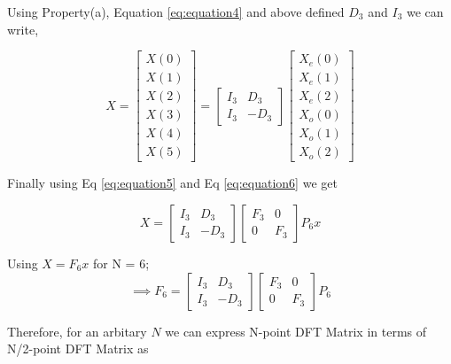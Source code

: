 \documentclass[journal,12pt,twocolumn]{IEEEtran}
\renewcommand\thesection{\arabic{section}}
\begin{document}
\begin{enumerate}[label=\thesection.\arabic*.,ref=\thesection.\theenumi]
Using Property(a), Equation \eqref{eq:equation4} and above defined $D_{3}$ and $I_{3}$ we can write,

\begin{equation}
X
=
\begin{bmatrix}
X(0) \\ 
X(1) \\ 
X(2) \\ 
X(3) \\ 
X(4) \\ 
X(5) 
\end{bmatrix}
=
\begin{bmatrix}
I_{3} & D_{3} \\
I_{3} & -D_{3}
\end{bmatrix}
\begin{bmatrix}
X_{e}(0) \\ 
X_{e}(1) \\ 
X_{e}(2) \\ 
X_{o}(0) \\ 
X_{o}(1) \\ 
X_{o}(2)
\end{bmatrix}
\label{eq:equation5}
\end{equation}

Finally using Eq \eqref{eq:equation5} and Eq \eqref{eq:equation6} we get


\begin{equation}
X
=
\begin{bmatrix}
I_{3} & D_{3} \\
I_{3} & -D_{3}
\end{bmatrix}
\begin{bmatrix}
F_{3} & 0 \\
0 & F_{3}
\end{bmatrix}
P_{6}
x 
\label{eq:equation7}
\end{equation}

Using $X = F_{6}x$ for N = 6;
\begin{equation}
\implies 
F_{6}
=
\begin{bmatrix}
I_{3} & D_{3} \\
I_{3} & -D_{3}
\end{bmatrix}
\begin{bmatrix}
F_{3} & 0 \\
0 & F_{3}
\end{bmatrix}
P_{6}
\end{equation}

Therefore, for an arbitary $N$ we can express N-point DFT Matrix in terms of N/2-point DFT Matrix as


\end{enumerate}
\end{document}
